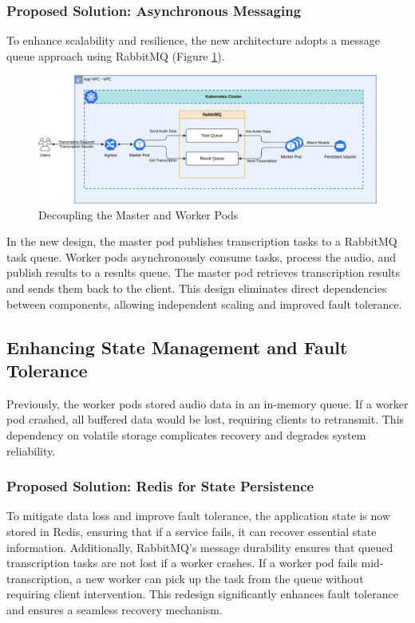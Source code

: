 \subsubsection{Proposed Solution: Asynchronous Messaging}
To enhance scalability and resilience, the new architecture adopts a message queue approach using RabbitMQ (Figure \ref{fig:decouple}).
\begin{figure}[!ht]
    \centering
    \includegraphics[width=\textwidth]{figures/decouple.drawio.png}
    \caption{Decoupling the Master and Worker Pods}
    \label{fig:decouple}
\end{figure}

In the new design, the master pod publishes transcription tasks to a RabbitMQ task queue. Worker pods asynchronously consume tasks, process the audio, and publish results to a results queue. The master pod retrieves transcription results and sends them back to the client. This design eliminates direct dependencies between components, allowing independent scaling and improved fault tolerance.

\subsection{Enhancing State Management and Fault Tolerance}
Previously, the worker pods stored audio data in an in-memory queue. If a worker pod crashed, all buffered data would be lost, requiring clients to retransmit. This dependency on volatile storage complicates recovery and degrades system reliability.

\subsubsection{Proposed Solution: Redis for State Persistence}
To mitigate data loss and improve fault tolerance, the application state is now stored in Redis, ensuring that if a service fails, it can recover essential state information. Additionally, RabbitMQ’s message durability ensures that queued transcription tasks are not lost if a worker crashes. If a worker pod fails mid-transcription, a new worker can pick up the task from the queue without requiring client intervention. This redesign significantly enhances fault tolerance and ensures a seamless recovery mechanism.

